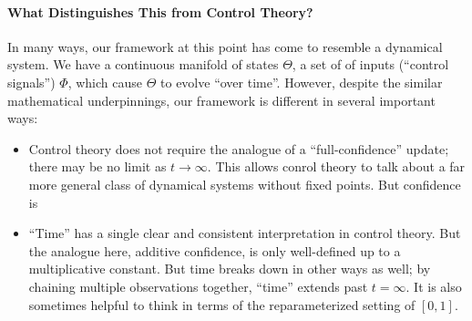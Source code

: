 \paragraph{What Distinguishes This from Control Theory?}
In many ways, our framework at this point has come to resemble a dynamical system. 
We have a continuous manifold of states $\Theta$, a set of 
	of inputs (``control signals'') $\Phi$, which cause $\Theta$ 
	to evolve ``over time''. 
However, despite the similar mathematical underpinnings, our framework 
is different in several important ways:

\begin{itemize}
	\item Control theory does not require the analogue of a ``full-confidence'' update; there may be no limit as $t \to \infty$.
	This allows conrol theory to talk about a far more general class of dynamical systems without fixed points. 
	But confidence is 
	
	\item ``Time'' has a single clear and consistent interpretation in control theory. But the analogue here, additive confidence, is only well-defined up to a multiplicative constant. But time breaks down in other ways as well; by chaining multiple observations together, ``time'' extends past $t=\infty$.
	It is also sometimes helpful to think in terms of the reparameterized setting of $[0,1]$.
	
\end{itemize}





